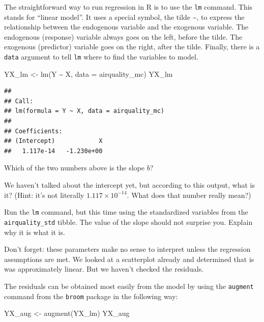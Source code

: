 \documentclass[
]{book}
\newenvironment{Shaded}{\begin{snugshade}}{\end{snugshade}}
\newcommand{\AttributeTok}[1]{\textcolor[rgb]{0.77,0.63,0.00}{#1}}
\newcommand{\FunctionTok}[1]{\textcolor[rgb]{0.00,0.00,0.00}{#1}}
\newcommand{\NormalTok}[1]{#1}
\newcommand{\OtherTok}[1]{\textcolor[rgb]{0.56,0.35,0.01}{#1}}
\newcommand{\SpecialCharTok}[1]{\textcolor[rgb]{0.00,0.00,0.00}{#1}}
\begin{document}
The straightforward way to run regression in R is to use the \texttt{lm} command. This stands for ``linear model''. It uses a special symbol, the tilde \textasciitilde, to express the relationship between the endogenous variable and the exogenous variable. The endogenous (response) variable always goes on the left, before the tilde. The exogenous (predictor) variable goes on the right, after the tilde. Finally, there is a \texttt{data} argument to tell \texttt{lm} where to find the variables to model.

\begin{Shaded}
\begin{Highlighting}[]
\NormalTok{YX\_lm }\OtherTok{\textless{}{-}} \FunctionTok{lm}\NormalTok{(Y }\SpecialCharTok{\textasciitilde{}}\NormalTok{ X, }\AttributeTok{data =}\NormalTok{ airquality\_mc)}
\NormalTok{YX\_lm}
\end{Highlighting}
\end{Shaded}

\begin{verbatim}
## 
## Call:
## lm(formula = Y ~ X, data = airquality_mc)
## 
## Coefficients:
## (Intercept)            X  
##   1.117e-14   -1.230e+00
\end{verbatim}

Which of the two numbers above is the slope \(b\)?

We haven't talked about the intercept yet, but according to this output, what is it? (Hint: it's not literally \(1.117 \times 10^{-14}\). What does that number really mean?)

Run the \texttt{lm} command, but this time using the standardized variables from the \texttt{airquality\_std} tibble. The value of the slope should not surprise you. Explain why it is what it is.

Don't forget: these parameters make no sense to interpret unless the regression assumptions are met. We looked at a scatterplot already and determined that is was approximately linear. But we haven't checked the residuals.

The residuals can be obtained most easily from the model by using the \texttt{augment} command from the \texttt{broom} package in the following way:

\begin{Shaded}
\begin{Highlighting}[]
\NormalTok{YX\_aug }\OtherTok{\textless{}{-}} \FunctionTok{augment}\NormalTok{(YX\_lm)}
\NormalTok{YX\_aug}
\end{Highlighting}
\end{Shaded}
\end{document}
